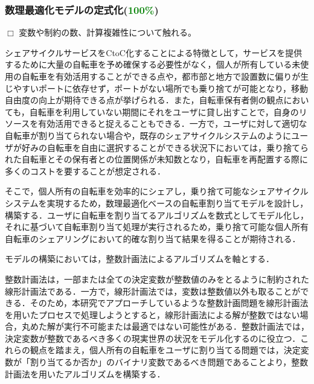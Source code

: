       \subsubsection{数理最適化モデルの定式化(\textcolor{green}{100\%})}
        \label{sec:数理最適化モデルの定式化}
          \par $\Box$ 変数や制約の数、計算複雑性について触れる。
          \par シェアサイクルサービスをCtoC化することによる特徴として，サービスを提供するために大量の自転車を予め確保する必要性がなく，個人が所有している未使用の自転車を有効活用することができる点や，都市部と地方で設置数に偏りが生じやすいポートに依存せず，ポートがない場所でも乗り捨てが可能となり，移動自由度の向上が期待できる点が挙げられる．また，自転車保有者側の観点においても，自転車を利用していない期間にそれをユーザに貸し出すことで，自身のリソースを有効活用できると捉えることもできる．一方で，ユーザに対して適切な自転車が割り当てられない場合や，既存のシェアサイクルシステムのようにユーザが好みの自転車を自由に選択することができる状況下においては，乗り捨てられた自転車とその保有者との位置関係が未知数となり，自転車を再配置する際に多くのコストを要することが想定される．
          
          \par そこで，個人所有の自転車を効率的にシェアし，乗り捨て可能なシェアサイクルシステムを実現するため，数理最適化ベースの自転車割り当てモデルを設計し，構築する．ユーザに自転車を割り当てるアルゴリズムを数式としてモデル化し，それに基づいて自転車割り当て処理が実行されるため，乗り捨て可能な個人所有自転車のシェアリングにおいて的確な割り当て結果を得ることが期待される．
          
          \par モデルの構築においては，整数計画法によるアルゴリズムを軸とする．
          
          \par 整数計画法は，一部または全ての決定変数が整数値のみをとるように制約された線形計画法である．一方で，線形計画法では，変数は整数値以外も取ることができる．そのため，本研究でアプローチしているような整数計画問題を線形計画法を用いたプロセスで処理しようとすると，線形計画法による解が整数ではない場合，丸めた解が実行不可能または最適ではない可能性がある．整数計画法では，決定変数が整数であるべき多くの現実世界の状況をモデル化するのに役立つ．これらの観点を踏まえ，個人所有の自転車をユーザに割り当てる問題では，決定変数が「割り当てるか否か」のバイナリ変数であるべき問題であることより，整数計画法を用いたアルゴリズムを構築する．
          
